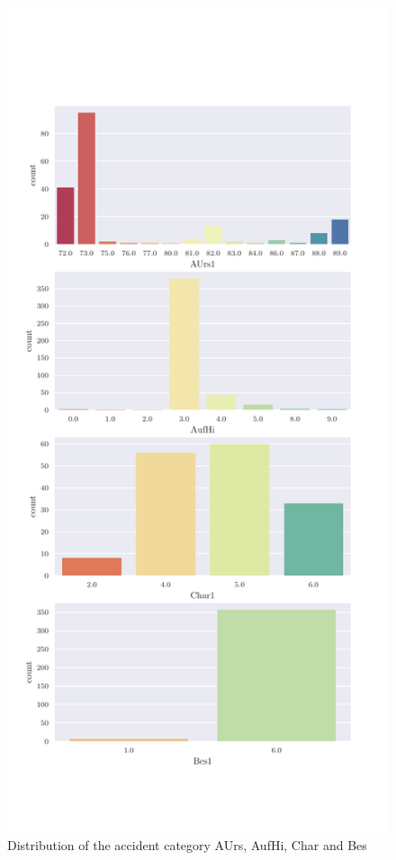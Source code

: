     \begin{figure}[ht!]
        \centering
        \includegraphics[scale=0.7]{code/data/BAYSIS/02_matched/plots/baysis_matched_count_multiple02}
        \caption{Distribution of the accident category AUrs, AufHi, Char and Bes}
        \label{img:baysis_matched_AUrs}
        \label{img:baysis_matched_AufHi}
        \label{img:baysis_matched_Char}
        \label{img:baysis_matched_Bes}
    \end{figure}

